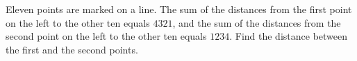 Eleven points are marked on a line. The sum of the distances from the first point on the left to the other ten equals $4321$, and the sum of the distances from the second point on the left to the other ten equals $1234$. Find the distance between the first and the second points.
